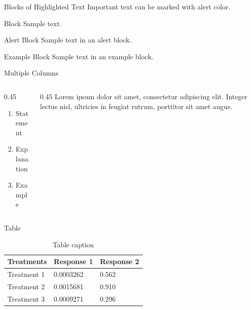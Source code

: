 \documentclass{xmu-beamer}
\begin{document}
\begin{frame}{Blocks of Highlighted Text}
    Important text can be marked with \alert{alert color}.

    \begin{block}{Block}
        Sample text.
    \end{block}

    \begin{alertblock}{Alert Block}
        Sample text in an alert block.
    \end{alertblock}

    \begin{exampleblock}{Example Block}
        Sample text in an example block.
    \end{exampleblock}
\end{frame}

\begin{frame}{Multiple Columns}
    \begin{columns}
        \begin{column}{0.45\textwidth}
            \begin{enumerate}
                \item Statement
                \item Explanation
                \item Example
            \end{enumerate}
        \end{column}
        \begin{column}{0.45\textwidth}
            Lorem ipsum dolor sit amet, consectetur adipiscing elit. Integer lectus nisl, ultricies in feugiat rutrum, porttitor sit amet augue.
        \end{column}
    \end{columns}
\end{frame}

\begin{frame}{Table}
    \begin{table}
        \begin{tabular}{l l l}
            \toprule
            \textbf{Treatments} & \textbf{Response 1} & \textbf{Response 2} \\
            \midrule
            Treatment 1         & 0.0003262           & 0.562               \\
            Treatment 2         & 0.0015681           & 0.910               \\
            Treatment 3         & 0.0009271           & 0.296               \\
            \bottomrule
        \end{tabular}
        \caption{Table caption}
    \end{table}
\end{frame}
\end{document}
